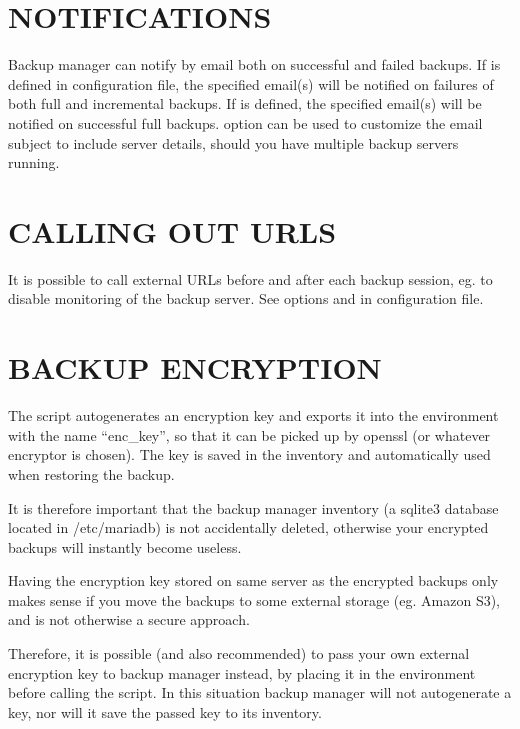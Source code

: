 \documentclass[letterpaper,10pt,english]{sphinxmanual}
\begin{document}
\section{NOTIFICATIONS}
\label{\detokenize{mariadb-backup-manager:notifications}}
\sphinxAtStartPar
Backup manager can notify by email both on successful and failed backups.
If  is defined in configuration file, the specified email(s) will be
notified on failures of both full and incremental backups.  If  is defined,
the specified email(s) will be notified on successful full backups.
 option can be used to customize the email subject to include server details,
should you have multiple backup servers running.


\section{CALLING OUT URLS}
\label{\detokenize{mariadb-backup-manager:calling-out-urls}}
\sphinxAtStartPar
It is possible to call external URLs before and after each backup session, eg. to disable
monitoring of the backup server. See options  and 
in configuration file.


\section{BACKUP ENCRYPTION}
\label{\detokenize{mariadb-backup-manager:backup-encryption}}
\sphinxAtStartPar
The script autogenerates an encryption key and exports it into the environment with the name
“enc\_key”, so that it can be picked up by openssl (or whatever encryptor is chosen).
The key is saved in the inventory and automatically used when restoring the backup.

\sphinxAtStartPar
It is therefore important that the backup manager inventory (a sqlite3 database located in
/etc/mariadb) is not accidentally deleted, otherwise your encrypted backups will instantly
become useless.

\sphinxAtStartPar
Having the encryption key stored on same server as the encrypted backups only makes sense
if you move the backups to some external storage (eg. Amazon S3), and is not otherwise
a secure approach.

\sphinxAtStartPar
Therefore, it is possible (and also recommended) to pass your own external encryption key
to backup manager instead, by placing it in the environment before calling the script.  In this
situation backup manager will not autogenerate a key, nor will it save the passed key to its
inventory.
\end{document}
